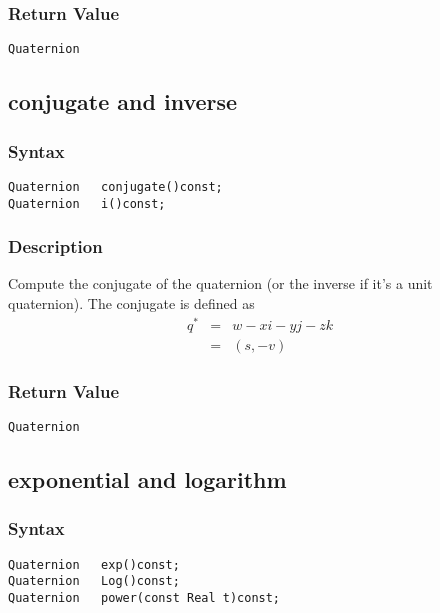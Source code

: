 \documentclass[dvips,11pt,fleqn]{report}
\begin{document}
\subsubsection*{Return Value}

{\tt Quaternion}

\newpage

\subsection*{conjugate and inverse}

\subsubsection*{Syntax}
\begin{verbatim}
Quaternion   conjugate()const;
Quaternion   i()const;
\end{verbatim}
\subsubsection{Description}
Compute the conjugate of the quaternion (or the inverse if it's a
unit quaternion). The conjugate is defined as
\begin{eqnarray}
 q^{*} & = & w - xi - yj - zk \\
       & = & (s,-v)
\end{eqnarray}

\subsubsection*{Return Value}

{\tt Quaternion}

\newpage

\subsection*{exponential and logarithm}

\subsubsection*{Syntax}
\begin{verbatim}
Quaternion   exp()const;
Quaternion   Log()const;
Quaternion   power(const Real t)const;
\end{verbatim}
\end{document}

